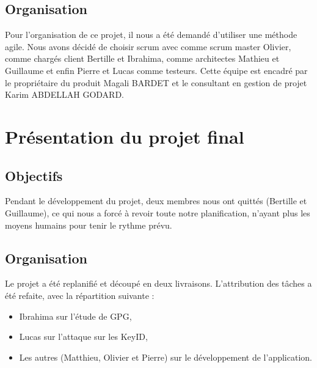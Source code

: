 \documentclass{../res/univ-projet}
\begin{document}
  
  \subsection{Organisation}
  
  Pour l'organisation de ce projet, il nous a été demandé d'utiliser une méthode agile. Nous avons décidé de choisir scrum avec comme scrum master Olivier, comme chargés client Bertille et Ibrahima, comme architectes Mathieu et Guillaume et enfin Pierre et Lucas comme testeurs. Cette équipe est encadré par le propriétaire du produit Magali BARDET et le consultant en gestion de projet 	Karim ABDELLAH GODARD.
  
  \newpage

\section{Présentation du projet final}
  \subsection{Objectifs}
    Pendant le développement du projet, deux membres nous ont quittés (Bertille et Guillaume), ce qui nous a forcé à revoir toute notre planification, n'ayant plus les moyens humains pour tenir le rythme prévu.
  \subsection{Organisation}
    
    Le projet a été replanifié et découpé en deux livraisons.
    L'attribution des tâches a été refaite, avec la répartition suivante :
    \begin{itemize}
      \item Ibrahima sur l'étude de GPG,
      \item Lucas sur l'attaque sur les KeyID,
      \item Les autres (Matthieu, Olivier et Pierre) sur le développement de l'application.
    \end{itemize}
\end{document}
